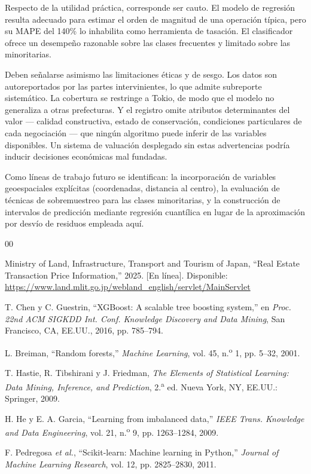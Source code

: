 \documentclass[conference]{IEEEtran}
\begin{document}
Respecto de la utilidad práctica, corresponde ser cauto. El modelo de regresión resulta
adecuado para estimar el orden de magnitud de una operación típica, pero su MAPE del 140\% lo
inhabilita como herramienta de tasación. El clasificador ofrece un desempeño razonable sobre
las clases frecuentes y limitado sobre las minoritarias.

Deben señalarse asimismo las limitaciones éticas y de sesgo. Los datos son autoreportados por
las partes intervinientes, lo que admite subreporte sistemático. La cobertura se restringe a
Tokio, de modo que el modelo no generaliza a otras prefecturas. Y el registro omite atributos
determinantes del valor --- calidad constructiva, estado de conservación, condiciones
particulares de cada negociación --- que ningún algoritmo puede inferir de las variables
disponibles. Un sistema de valuación desplegado sin estas advertencias podría inducir
decisiones económicas mal fundadas.

Como líneas de trabajo futuro se identifican: la incorporación de variables geoespaciales
explícitas (coordenadas, distancia al centro), la evaluación de técnicas de sobremuestreo para
las clases minoritarias, y la construcción de intervalos de predicción mediante regresión
cuantílica en lugar de la aproximación por desvío de residuos empleada aquí.

\begin{thebibliography}{00}

Ministry of Land, Infrastructure, Transport and Tourism of Japan, ``Real Estate Transaction
Price Information,'' 2025. [En línea]. Disponible:
\url{https://www.land.mlit.go.jp/webland_english/servlet/MainServlet}

T. Chen y C. Guestrin, ``XGBoost: A scalable tree boosting system,'' en \textit{Proc. 22nd ACM
SIGKDD Int. Conf. Knowledge Discovery and Data Mining}, San Francisco, CA, EE.UU., 2016,
pp. 785--794.

L. Breiman, ``Random forests,'' \textit{Machine Learning}, vol. 45, n.\textsuperscript{o} 1,
pp. 5--32, 2001.

T. Hastie, R. Tibshirani y J. Friedman, \textit{The Elements of Statistical Learning: Data
Mining, Inference, and Prediction}, 2.\textsuperscript{a} ed. Nueva York, NY, EE.UU.:
Springer, 2009.

H. He y E. A. Garcia, ``Learning from imbalanced data,'' \textit{IEEE Trans. Knowledge and
Data Engineering}, vol. 21, n.\textsuperscript{o} 9, pp. 1263--1284, 2009.

F. Pedregosa \textit{et al.}, ``Scikit-learn: Machine learning in Python,'' \textit{Journal of
Machine Learning Research}, vol. 12, pp. 2825--2830, 2011.

\end{thebibliography}
\end{document}
